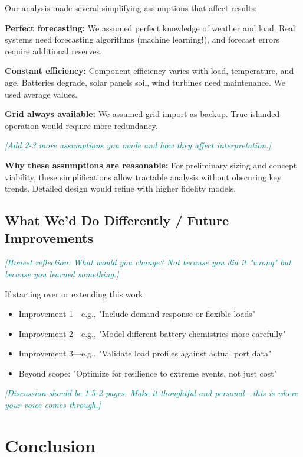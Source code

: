 \documentclass[11pt,letterpaper]{article}
\newcommand{\hint}[1]{\textcolor{teal}{\small\textit{[#1]}}}
\begin{document}
Our analysis made several simplifying assumptions that affect results:

\textbf{Perfect forecasting:} We assumed perfect knowledge of weather and load. Real systems need forecasting algorithms (machine learning!), and forecast errors require additional reserves.

\textbf{Constant efficiency:} Component efficiency varies with load, temperature, and age. Batteries degrade, solar panels soil, wind turbines need maintenance. We used average values.

\textbf{Grid always available:} We assumed grid import as backup. True islanded operation would require more redundancy.

\hint{Add 2-3 more assumptions you made and how they affect interpretation.}

\textbf{Why these assumptions are reasonable:} For preliminary sizing and concept viability, these simplifications allow tractable analysis without obscuring key trends. Detailed design would refine with higher fidelity models.

\subsection{What We'd Do Differently / Future Improvements}

\hint{Honest reflection: What would you change? Not because you did it "wrong" but because you learned something.}

If starting over or extending this work:
\begin{itemize}
    \item Improvement 1—e.g., "Include demand response or flexible loads"
    \item Improvement 2—e.g., "Model different battery chemistries more carefully"    \item Improvement 3—e.g., "Validate load profiles against actual port data"
    \item Beyond scope: "Optimize for resilience to extreme events, not just cost"
\end{itemize}

\hint{Discussion should be 1.5-2 pages. Make it thoughtful and personal—this is where your voice comes through.}

\section{Conclusion}
\end{document}
